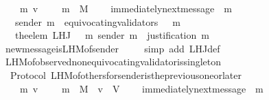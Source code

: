 \begin{isabellebody}
\ \ {\isachardoublequoteopen}{\isasymforall}\ {\isasymsigma}\ m\ v{\isachardot}\ {\isasymsigma}\ {\isasymin}\ {\isasymSigma}\ {\isasymand}\ m\ {\isasymin}\ M\ \isanewline
\ \ {\isasymlongrightarrow}\ immediately{\isacharunderscore}next{\isacharunderscore}message\ {\isacharparenleft}{\isasymsigma}{\isacharcomma}\ m{\isacharparenright}\isanewline
\ \ {\isasymlongrightarrow}\ sender\ m\ {\isasymnotin}\ equivocating{\isacharunderscore}validators\ {\isacharparenleft}{\isasymsigma}\ {\isasymunion}\ {\isacharbraceleft}m{\isacharbraceright}{\isacharparenright}\isanewline
\ \ {\isasymlongrightarrow}\ the{\isacharunderscore}elem\ {\isacharparenleft}L{\isacharunderscore}H{\isacharunderscore}J\ {\isacharparenleft}{\isasymsigma}\ {\isasymunion}\ {\isacharbraceleft}m{\isacharbraceright}{\isacharparenright}\ {\isacharparenleft}sender\ m{\isacharparenright}{\isacharparenright}\ {\isacharequal}\ justification\ m{\isachardoublequoteclose}\isanewline
%
\isadelimproof
\ \ %
\endisadelimproof
%
\isatagproof
{}\isamarkupfalse%
\ new{\isacharunderscore}message{\isacharunderscore}is{\isacharunderscore}L{\isacharunderscore}H{\isacharunderscore}M{\isacharunderscore}of{\isacharunderscore}sender\ \isanewline
\ \ \isamarkupfalse%
\ {\isacharparenleft}simp\ add{\isacharcolon}\ L{\isacharunderscore}H{\isacharunderscore}J{\isacharunderscore}def{\isacharparenright}\ \isanewline
\ \ \isamarkupfalse%
\ L{\isacharunderscore}H{\isacharunderscore}M{\isacharunderscore}of{\isacharunderscore}observed{\isacharunderscore}non{\isacharunderscore}equivocating{\isacharunderscore}validator{\isacharunderscore}is{\isacharunderscore}singleton\isanewline
\ \ \isamarkupfalse%
%
\endisatagproof
{\isafoldproof}%
%
\isadelimproof
\ \ \isanewline
%
\endisadelimproof
\isanewline
\isanewline
\isanewline
\isanewline
{}\isamarkupfalse%
\ {\isacharparenleft}\ Protocol{\isacharparenright}\ L{\isacharunderscore}H{\isacharunderscore}M{\isacharunderscore}of{\isacharunderscore}others{\isacharunderscore}for{\isacharunderscore}sender{\isacharunderscore}is{\isacharunderscore}the{\isacharunderscore}previous{\isacharunderscore}one{\isacharunderscore}or{\isacharunderscore}later{\isacharcolon}\isanewline
\ \ {\isachardoublequoteopen}{\isasymforall}\ {\isasymsigma}\ m\ v{\isachardot}\ {\isasymsigma}\ {\isasymin}\ {\isasymSigma}\ {\isasymand}\ m\ {\isasymin}\ M\ {\isasymand}\ v\ {\isasymin}\ V\ \isanewline
\ \ {\isasymlongrightarrow}\ immediately{\isacharunderscore}next{\isacharunderscore}message\ {\isacharparenleft}{\isasymsigma}{\isacharcomma}\ m{\isacharparenright}\isanewline

\end{isabellebody}
